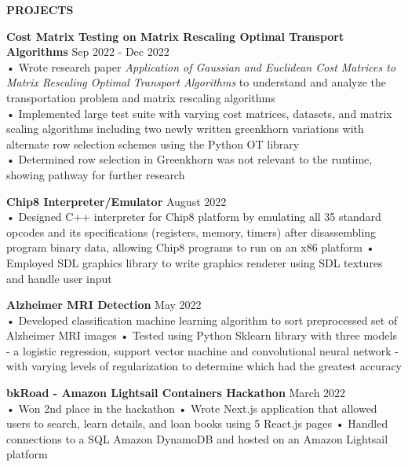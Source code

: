 \documentclass{resume} %
\begin{document}
\begin{rSection}{\textbf{PROJECTS}}

\textbf{Cost Matrix Testing on Matrix Rescaling Optimal Transport Algorithms} \hfill Sep 2022 - Dec 2022 \\
• Wrote research paper \emph{Application of Gaussian and Euclidean Cost Matrices to Matrix Rescaling Optimal Transport Algorithms} to understand and analyze the transportation problem and matrix rescaling algorithms\\ 
• Implemented large test suite with varying cost matrices, datasets, and matrix scaling algorithms including two newly written greenkhorn variations with alternate row selection schemes using the Python OT library \\ 
• Determined row selection in Greenkhorn was not relevant to the runtime, showing pathway for further research

\textbf{Chip8 Interpreter/Emulator } \hfill August 2022 \\
• Designed C++ interpreter for Chip8 platform by emulating all 35 standard opcodes and its specifications (registers, memory, timers) after disassembling program binary data, allowing Chip8 programs to run on an x86 platform \newline
• Employed SDL graphics library to write graphics renderer using SDL textures and handle user input \smallskip

\textbf{Alzheimer MRI Detection } \hfill May 2022 \\
• Developed classification machine learning algorithm to sort preprocessed set of Alzheimer MRI images
\newline
• Tested using Python Sklearn library with three models - a logistic regression, support vector machine and convolutional neural network - with varying levels of regularization to determine which had the greatest accuracy 

\textbf{bkRoad - Amazon Lightsail Containers Hackathon } \hfill March 2022 \\
• Won 2nd place in the hackathon \newline
• Wrote Next.js application that allowed users to search, learn details, and loan books using 5 React.js pages \newline
• Handled connections to a SQL Amazon DynamoDB and hosted on an Amazon Lightsail platform


\end{rSection} 
\end{document}
